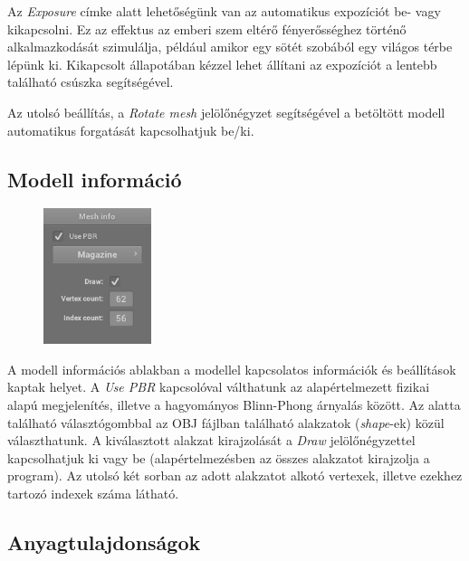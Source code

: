 Az \textit{Exposure} címke alatt lehetőségünk van az automatikus expozíciót be- vagy kikapcsolni. Ez az effektus az emberi szem eltérő fényerősséghez történő alkalmazkodását szimulálja, például amikor egy sötét szobából egy világos térbe lépünk ki. Kikapcsolt állapotában kézzel lehet állítani az expozíciót a lentebb található csúszka segítségével.

Az utolsó beállítás, a \textit{Rotate mesh} jelölőnégyzet segítségével a betöltött modell automatikus forgatását kapcsolhatjuk be/ki.

\clearpage

\subsection{Modell információ}

\begin{figure}
    \vspace{-23pt}
    \includegraphics[width=0.28\textwidth]{images/mesh_info.png}
    \vspace{-20pt}
\end{figure}

A modell információs ablakban a modellel kapcsolatos információk és beállítások kaptak helyet. A \textit{Use PBR} kapcsolóval válthatunk az alapértelmezett fizikai alapú megjelenítés, illetve a hagyományos Blinn-Phong árnyalás között. Az alatta található választógombbal az OBJ fájlban található alakzatok (\textit{shape}-ek) közül választhatunk. A kiválasztott alakzat kirajzolását a \textit{Draw} jelölőnégyzettel kapcsolhatjuk ki vagy be (alapértelmezésben az összes alakzatot kirajzolja a program). Az utolsó két sorban az adott alakzatot alkotó vertexek, illetve ezekhez tartozó indexek száma látható.

\subsection{Anyagtulajdonságok}

